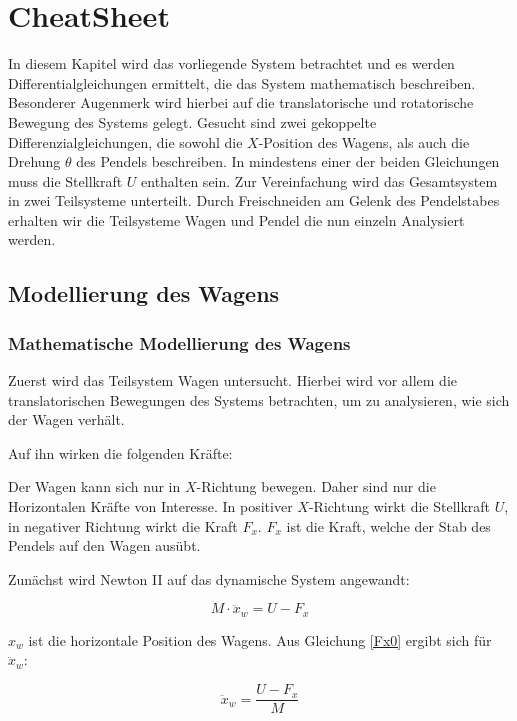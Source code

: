 \chapter{CheatSheet}

In diesem Kapitel wird das vorliegende System betrachtet und es werden Differentialgleichungen ermittelt, die das System mathematisch beschreiben. Besonderer Augenmerk wird hierbei auf die translatorische und rotatorische Bewegung des Systems gelegt. Gesucht sind zwei gekoppelte Differenzialgleichungen, die sowohl
die $X$-Position des Wagens, als auch die Drehung $\theta$ des Pendels beschreiben. In
mindestens einer der beiden Gleichungen muss die Stellkraft $U$ enthalten sein.
Zur Vereinfachung wird das Gesamtsystem in zwei Teilsysteme unterteilt. Durch
Freischneiden am Gelenk des Pendelstabes erhalten wir die Teilsysteme Wagen
und Pendel die nun einzeln Analysiert werden. 


\section{Modellierung des Wagens}
\subsection{Mathematische Modellierung des Wagens}
Zuerst wird das Teilsystem Wagen untersucht. Hierbei wird vor allem die translatorischen Bewegungen des Systems betrachten, um zu analysieren, wie sich der Wagen verhält. 

Auf ihn wirken die folgenden Kräfte:


Der Wagen kann sich nur in $X$-Richtung bewegen. Daher sind nur die Horizontalen Kräfte von Interesse. In positiver $X$-Richtung wirkt die Stellkraft $U$, in negativer Richtung wirkt die Kraft $F_x$. $F_x$ ist die Kraft, welche der Stab des Pendels auf den Wagen ausübt.

Zunächst wird Newton II auf das dynamische System angewandt:

\begin{equation}
M \cdot \ddot{x}_w =  U -F_x
\label{Fx0}
\end{equation}

$x_w$ ist die horizontale Position des Wagens. Aus Gleichung \ref{Fx0} ergibt sich für $\ddot{x}_w$:

\begin{equation}
\ddot{x}_w =  \frac{U - F_x}{M}
\label{x_wpp}
\end{equation}

